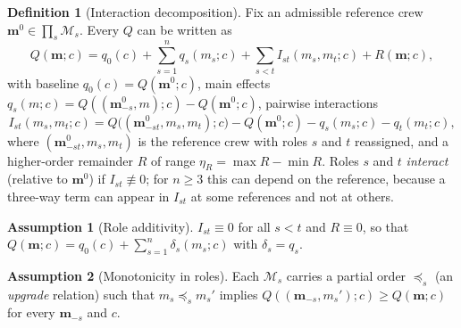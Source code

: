 \documentclass[11pt,a4paper]{article}
\theoremstyle{definition}
\newtheorem{definition}{Definition}
\newtheorem{assumption}{Assumption}
\theoremstyle{remark}
\theoremstyle{definition}
\newcommand{\mods}{\mathcal{M}}
\newcommand{\crew}{\mathbf{m}}
\begin{document}
\begin{definition}[Interaction decomposition]
\label{def:interact}
Fix an admissible reference crew $\crew^0\in\prod_s\mods_s$. Every $Q$ can be written as
\begin{equation}
Q(\crew;c)=q_0(c)+\sum_{s=1}^n q_s(m_s;c)+\sum_{s<t}I_{st}(m_s,m_t;c)+R(\crew;c),
\label{eq:interact}
\end{equation}
with baseline $q_0(c)=Q(\crew^0;c)$, main effects $q_s(m;c)=Q((\crew^0_{-s},m);c)-Q(\crew^0;c)$, pairwise interactions
\[
I_{st}(m_s,m_t;c)=Q\big((\crew^0_{-st},m_s,m_t);c\big)-Q(\crew^0;c)-q_s(m_s;c)-q_t(m_t;c),
\]
where $(\crew^0_{-st},m_s,m_t)$ is the reference crew with roles $s$ and $t$ reassigned, and a higher-order remainder $R$ of range $\eta_R=\max R-\min R$. Roles $s$ and $t$ \emph{interact} (relative to $\crew^0$) if $I_{st}\not\equiv0$; for $n\ge3$ this can depend on the reference, because a three-way term can appear in $I_{st}$ at some references and not at others.
\end{definition}

\begin{assumption}[Role additivity]
\label{ass:add}
$I_{st}\equiv0$ for all $s<t$ and $R\equiv0$, so that $Q(\crew;c)=q_0(c)+\sum_{s=1}^n\delta_s(m_s;c)$ with $\delta_s=q_s$.
\end{assumption}

\begin{assumption}[Monotonicity in roles]
\label{ass:mono}
Each $\mods_s$ carries a partial order $\preceq_s$ (an \emph{upgrade} relation) such that $m_s\preceq_s m_s'$ implies $Q((\crew_{-s},m_s');c)\ge Q(\crew;c)$ for every $\crew_{-s}$ and $c$.
\end{assumption}
\end{document}
